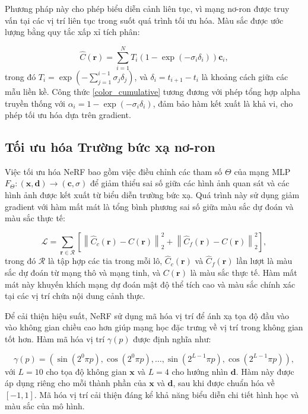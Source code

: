 Phương pháp này cho phép biểu diễn cảnh liên tục, vì mạng nơ-ron được truy vấn tại các vị trí liên tục trong suốt quá trình tối ưu hóa. Màu sắc được ước lượng bằng quy tắc xấp xỉ tích phân:

\begin{equation}\label{color_cumulative}
\hat{C}(\mathbf{r}) = \sum_{i=1}^N T_i \left(1 - \exp(-\sigma_i \delta_i)\right) \mathbf{c}_i,
\end{equation}
trong đó $T_i = \exp\left(-\sum_{j=1}^{i-1} \sigma_j \delta_j\right)$, và $\delta_i = t_{i+1} - t_i$ là khoảng cách giữa các mẫu liền kề. Công thức \ref{color_cumulative} tương đương với phép tổng hợp alpha truyền thống với $\alpha_i = 1 - \exp(-\sigma_i \delta_i)$, đảm bảo hàm kết xuất là khả vi, cho phép tối ưu hóa dựa trên gradient.

\subsection{Tối ưu hóa Trường bức xạ nơ-ron} \label{subsec:optimizing_nerf}

Việc tối ưu hóa NeRF bao gồm việc điều chỉnh các tham số $\Theta$ của mạng MLP $F_\Theta: (\mathbf{x}, \mathbf{d}) \to (\mathbf{c}, \sigma)$ để giảm thiểu sai số giữa các hình ảnh quan sát và các hình ảnh được kết xuất từ biểu diễn trường bức xạ. Quá trình này sử dụng giảm gradient với hàm mất mát là tổng bình phương sai số giữa màu sắc dự đoán và màu sắc thực tế:

\begin{equation}
\mathcal{L} = \sum_{\mathbf{r} \in \mathcal{R}} \left[ \left\| \hat{C}_c(\mathbf{r}) - C(\mathbf{r}) \right\|_2^2 + \left\| \hat{C}_f(\mathbf{r}) - C(\mathbf{r}) \right\|_2^2 \right],
\end{equation}
trong đó $\mathcal{R}$ là tập hợp các tia trong mỗi lô, $\hat{C}_c(\mathbf{r})$ và $\hat{C}_f(\mathbf{r})$ lần lượt là màu sắc dự đoán từ mạng thô và mạng tinh, và $C(\mathbf{r})$ là màu sắc thực tế. Hàm mất mát này khuyến khích mạng dự đoán mật độ thể tích cao và màu sắc chính xác tại các vị trí chứa nội dung cảnh thực.

Để cải thiện hiệu suất, NeRF sử dụng mã hóa vị trí để ánh xạ tọa độ đầu vào vào không gian chiều cao hơn giúp mạng học đặc trưng về vị trí trong không gian tốt hơn. Hàm mã hóa vị trí $\gamma(p)$ được định nghĩa như:

\begin{equation}
\gamma(p) = \left( \sin(2^0 \pi p), \cos(2^0 \pi p), \ldots, \sin(2^{L-1} \pi p), \cos(2^{L-1} \pi p) \right),
\end{equation}
với $L=10$ cho tọa độ không gian $\mathbf{x}$ và $L=4$ cho hướng nhìn $\mathbf{d}$. Hàm này được áp dụng riêng cho mỗi thành phần của $\mathbf{x}$ và $\mathbf{d}$, sau khi được chuẩn hóa về $[-1, 1]$. Mã hóa vị trí cải thiện đáng kể khả năng biểu diễn chi tiết hình học và màu sắc của mô hình.

